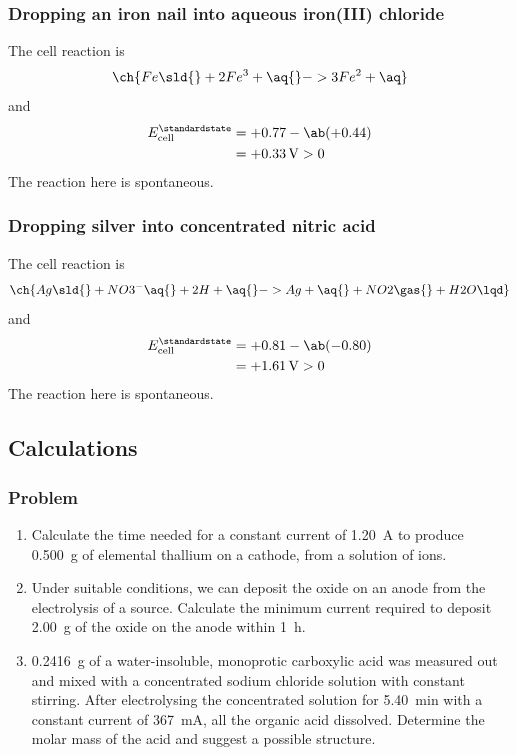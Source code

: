 \subsubsection{Dropping an iron nail into aqueous iron(III) chloride}
The cell reaction is 
\begin{equation*}
	\ch{Fe \sld{} + 2 Fe^3+ \aq{} -> 3 Fe^2+ \aq}
\end{equation*}
and
\begin{align*}
	E^\standardstate_\text{cell} & = +0.77 - \ab(+0.44)     \\
	                             & = +\qty{0.33}{\volt} > 0
\end{align*}
The reaction here is {\color{accent} spontaneous}.

\subsubsection{Dropping silver into concentrated nitric acid}

The cell reaction is
\begin{equation*}
	\ch{Ag \sld{} + NO3^- \aq{} + 2 H+ \aq{} ->  Ag+ \aq{} + NO2 \gas{} + H2O \lqd}
\end{equation*}
and
\begin{align*}
	E^\standardstate_\text{cell} & = +0.81 - \ab(-0.80)     \\
	                             & = +\qty{1.61}{\volt} > 0
\end{align*}
The reaction here is {\color{accent} spontaneous}.

\subsection{Calculations}
\subsubsection{Problem}
\begin{enumerate}
	\item Calculate the time needed for a constant current of \qty{1.20}{\ampere} to produce
	      \qty{0.500}{\gram} of elemental thallium on a cathode, from a solution of 
	      ions.

	\item Under suitable conditions, we can deposit the oxide  on an anode
	      from the electrolysis of a  source. Calculate the minimum current
	      required to deposit \qty{2.00}{\gram} of the oxide on the anode within \qty{1}{\hour}.

	\item \qty{.2416}{\gram} of a water-insoluble, monoprotic carboxylic acid was measured out
	      and mixed with a concentrated sodium chloride solution with constant stirring. After
	      electrolysing the concentrated solution for \qty{5.40}{\minute} with a constant current
	      of \qty{367}{\milli\ampere}, all the organic acid dissolved. Determine the molar mass
	      of the acid and suggest a possible structure.
\end{enumerate}

